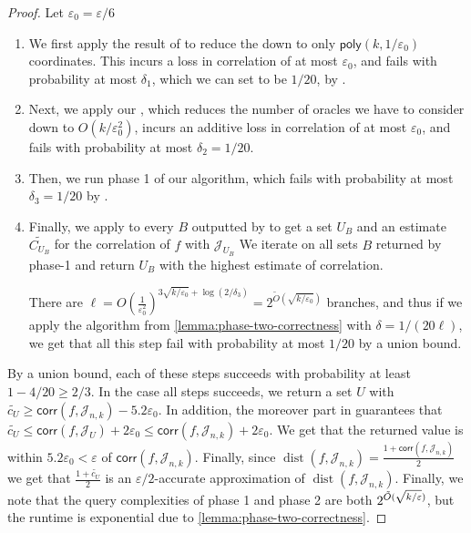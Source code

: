 \documentclass[10pt,a4paper]{article}
\providecommand{\poly}{\mathsf{poly}}
\theoremstyle{plain}
\theoremstyle{remark}
\theoremstyle{plain}
\newcommand{\eps}{\varepsilon}
\renewcommand{\tilde}{\widetilde}
\newcommand{\calJ}{\mathcal{J}}
\newcommand{\dist}{\operatorname{dist}}
\newcommand{\corr}{\mathsf{corr}}
\begin{document}
\begin{proof}
Let $\eps_0 = \eps/6$
\begin{enumerate}
    \item We first apply the result of \cite{junta-coordinate-oracles} to reduce the  down to only $\poly(k,1/\eps_0)$ coordinates.
This incurs a loss in correlation of at most $\eps_0$, and fails with probability at most $\delta_1$, which we can set to be $1/20$, by .
\item Next, we apply our , which reduces the number of oracles we have to consider down to $O(k/\eps_0^2)$, incurs an additive loss in correlation of at most $\eps_0$, and fails with probability at most $\delta_2 = 1/20$.
\item Then, we run phase 1 of our algorithm, which fails with probability at most $\delta_3 = 1/20$ by .
\item 
Finally, we apply  to every $B$ outputted by  to get a set $U_B$ and an estimate $\tilde{C_{U_B}}$ for the correlation of $f$ with $\calJ_{U_B}$ 
We iterate on all sets $B$ returned by phase-1 and return $U_B$ with the highest estimate of correlation.



    There are $\ell = O(\frac{1}{\eps_0^2})^{3\sqrt{k/\eps_0} + \log(2/\delta_3)} = 2^{\tilde{O}(\sqrt{k/\eps_0})}$ branches, and thus if we apply the algorithm from \cref{lemma:phase-two-correctness} with $\delta = 1/(20\ell)$, we get that all this step fail with probability at most $1/20$ by a union bound. 
\end{enumerate}

By a union bound, each of these steps succeeds with probability at least $1 - 4/20 \geq 2/3$.
In the case all steps succeeds, we return a set $U$ with $\tilde{c_U} \ge \corr(f, \calJ_{n,k})-5.2\eps_0$. In addition, the moreover part in  guarantees that $\tilde{c_U} \le \corr(f, \calJ_{U}) + 2\eps_0 \le \corr(f, \calJ_{n,k}) + 2\eps_0$. We get that the returned value is within $5.2\eps_0 < \eps$ of $\corr(f,\calJ_{n,k})$.
Finally, since $\dist(f,\calJ_{n,k}) = \frac{1+\corr(f,\calJ_{n,k})}{2}$ we get that $\frac{1+ \tilde{c_U}}{2}$ is an $\eps/2$-accurate approximation of $\dist(f,\calJ_{n,k})$. Finally, we note that the query complexities of phase 1 and phase 2 are both $2^{\Tilde{O}(\sqrt{k/\eps})}$, but the runtime is exponential due to \cref{lemma:phase-two-correctness}.
\end{proof}
\end{document}
